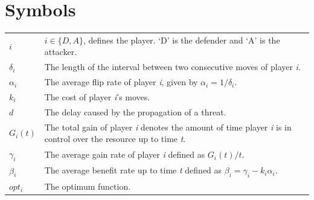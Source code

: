 \documentclass[master=cws, masteroption=vs]{kulemt}
\begin{document}
\section*{Symbols}
\begin{flushleft}
  \renewcommand{\arraystretch}{1.1}
  \begin{tabularx}{\textwidth}{@{}p{12mm}X@{}}
 $i$ & $i \in \{D,A\}$, defines the player. `D' is the defender and `A' is the attacker. \\
 $\delta_{i}$ & The length of the interval between two consecutive moves of player \textit{i}. \\
 $\alpha_{i}$ & The average flip rate of player \textit{i}, given by $\alpha_{i}=1/\delta_{i}$. \\
$k_{i}$ & The cost of player \textit{i}'s moves. \\
$d$ & The delay caused by the propagation of a threat. \\
 $G_{i}(t)$ & The total gain of player \textit{i} denotes the amount of time player \textit{i} is in control over the resource up to time \textit{t}. \\
$\gamma_{i}$ & The average gain rate of player \textit{i} defined as $G_{i}(t)/t$. \\
$\beta_{i}$ &  The average benefit rate up to time \textit{t} defined as  $\beta_{i} = \gamma_{i} -k_{i} \alpha_{i} $. \\
$opt_{i}$ & The optimum function. \\
  \end{tabularx}
\end{flushleft}

\mainmatter

%


%







%
%
%
%
%


%
%

\backmatter


\end{document}
